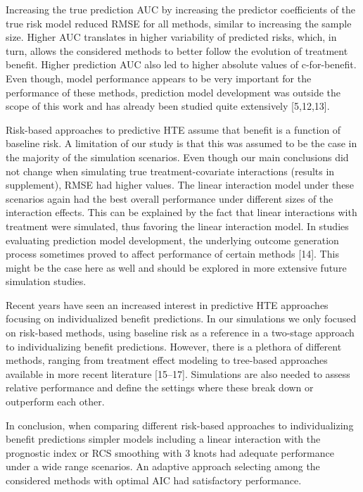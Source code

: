 \documentclass{article}
\begin{document}
Increasing the true prediction AUC by increasing the predictor
coefficients of the true risk model reduced RMSE for all methods,
similar to increasing the sample size. Higher AUC translates in higher
variability of predicted risks, which, in turn, allows the considered
methods to better follow the evolution of treatment benefit. Higher
prediction AUC also led to higher absolute values of c-for-benefit. Even
though, model performance appears to be very important for the
performance of these methods, prediction model development was outside
the scope of this work and has already been studied quite extensively
{[}5,12,13{]}.

Risk-based approaches to predictive HTE assume that benefit is a
function of baseline risk. A limitation of our study is that this was
assumed to be the case in the majority of the simulation scenarios. Even
though our main conclusions did not change when simulating true
treatment-covariate interactions (results in supplement), RMSE had
higher values. The linear interaction model under these scenarios again
had the best overall performance under different sizes of the
interaction effects. This can be explained by the fact that linear
interactions with treatment were simulated, thus favoring the linear
interaction model. In studies evaluating prediction model development,
the underlying outcome generation process sometimes proved to affect
performance of certain methods {[}14{]}. This might be the case here as
well and should be explored in more extensive future simulation studies.

Recent years have seen an increased interest in predictive HTE
approaches focusing on individualized benefit predictions. In our
simulations we only focused on risk-based methods, using baseline risk
as a reference in a two-stage approach to individualizing benefit
predictions. However, there is a plethora of different methods, ranging
from treatment effect modeling to tree-based approaches available in
more recent literature {[}15--17{]}. Simulations are also needed to
assess relative performance and define the settings where these break
down or outperform each other.

In conclusion, when comparing different risk-based approaches to
individualizing benefit predictions simpler models including a linear
interaction with the prognostic index or RCS smoothing with 3 knots had
adequate performance under a wide range scenarios. An adaptive approach
selecting among the considered methods with optimal AIC had satisfactory
performance.
\end{document}
